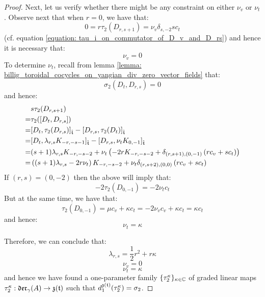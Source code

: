 \begin{proof}
                Next, let us verify whether there might be any constraint on either $\nu_v$ or $\nu_t$. Observe next that when $r = 0$, we have that:
                    $$0 = r \tau_2(D_{r, s + 1}) = \nu_v \delta_{s, -2} sc_t$$
                (cf. equation \eqref{equation: tau_i_on_commutator_of_D_v_and_D_rs}) and hence it is necessary that:
                    $$\nu_v = 0$$
                To determine $\nu_t$, recall from lemma \ref{lemma: billig_toroidal_cocycles_on_yangian_div_zero_vector_fields} that:
                    $$\sigma_2(D_t, D_{r, s}) = 0$$
                and hence:
                    $$
                        \begin{aligned}
                            & s \tau_2(D_{r, s + 1})
                            \\
                            = & \tau_2([D_t, D_{r, s}])
                            \\
                            = & [D_t, \tau_2(D_{r, s})]_{\hat{\mathfrak{t}}} - [D_{r, s}, \tau_2(D_t)]_{\hat{\mathfrak{t}}} 
                            \\
                            = & [D_t, \lambda_{r, s} K_{-r, -s - 1}]_{\hat{\mathfrak{t}}} - [D_{r, s}, \nu_t K_{0, -1}]_{\hat{\mathfrak{t}}}
                            \\
                            = & (s + 1) \lambda_{r, s} K_{-r, -s - 2} + \nu_t \left( -2r K_{-r, -s - 2} + \delta_{(r, s + 1), (0, -1)} \left( r c_v + s c_t \right) \right)
                            \\
                            = & \left( (s + 1) \lambda_{r, s} - 2r \nu_t \right) K_{-r, -s - 2} + \nu_t \delta_{(r, s + 2), (0, 0)} \left( r c_v + s c_t \right)
                        \end{aligned}
                    $$
                If $(r, s) = (0, -2)$ then the above will imply that:
                    $$-2\tau_2(D_{0, -1}) = -2\nu_t c_t$$
                But at the same time, we have that:
                    $$\tau_2(D_{0, -1}) = \mu c_v + \kappa c_t = -2\nu_v c_v + \kappa c_t = \kappa c_t$$
                and hence:
                    $$\nu_t = \kappa$$
                    
                Therefore, we can conclude that:
                    \begin{equation} \label{equation: lambda_rs_formula}
                        \lambda_{r, s} = \frac12 r^2 + r\kappa
                    \end{equation}
                    $$\nu_v = 0$$
                    $$\nu_t = \kappa$$
                and hence we have found a one-parameter family $\{\tau_2^{\kappa}\}_{\kappa \in \mathbb{C}}$ of graded linear maps $\tau_2^{\kappa}: \mathfrak{der}_{\gamma}(A) \to \mathfrak{z}(\mathfrak{t})$ such that $d_1^{\mathfrak{z}(\mathfrak{t})}(\tau_2^{\kappa}) = \sigma_2$.
            

\end{proof}
